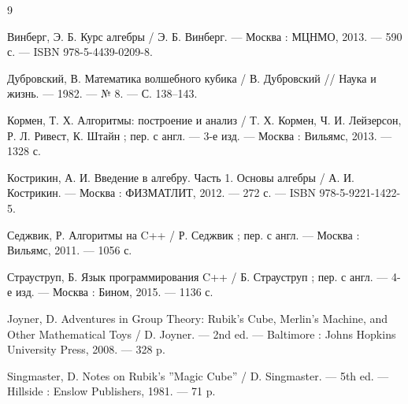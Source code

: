 \documentclass{article}
\begin{document}
\begin{thebibliography}{9}

Винберг, Э. Б. Курс алгебры / Э. Б. Винберг. --- Москва : МЦНМО, 2013. --- 590 с. --- ISBN 978-5-4439-0209-8.

Дубровский, В. Математика волшебного кубика / В. Дубровский // Наука и жизнь. --- 1982. --- № 8. --- С. 138--143.

Кормен, Т. Х. Алгоритмы: построение и анализ / Т. Х. Кормен, Ч. И. Лейзерсон, Р. Л. Ривест, К. Штайн ; пер. с англ. --- 3-е изд. --- Москва : Вильямс, 2013. --- 1328 с.

Кострикин, А. И. Введение в алгебру. Часть 1. Основы алгебры / А. И. Кострикин. --- Москва : ФИЗМАТЛИТ, 2012. --- 272 с. --- ISBN 978-5-9221-1422-5.

Седжвик, Р. Алгоритмы на C++ / Р. Седжвик ; пер. с англ. --- Москва : Вильямс, 2011. --- 1056 с.

Страуструп, Б. Язык программирования C++ / Б. Страуструп ; пер. с англ. --- 4-е изд. --- Москва : Бином, 2015. --- 1136 с.

Joyner, D. Adventures in Group Theory: Rubik's Cube, Merlin's Machine, and Other Mathematical Toys / D. Joyner. --- 2nd ed. --- Baltimore : Johns Hopkins University Press, 2008. --- 328 p.

Singmaster, D. Notes on Rubik's ''Magic Cube'' / D. Singmaster. --- 5th ed. --- Hillside : Enslow Publishers, 1981. --- 71 p.

\end{thebibliography}
\end{document}
